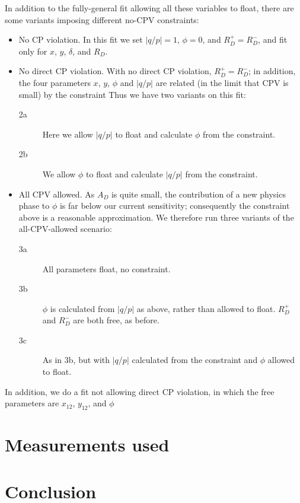 \documentclass[12pt,pdflatex]{article}
\begin{document}
In addition to the fully-general fit allowing all these variables to float, 
there are some variants imposing different no-CPV constraints:
\begin{itemize}
\item No CP violation. In this fit we set $|q/p|=1$, $\phi=0$, and $R_D^+=R_D^-$, 
and fit only for $x$, $y$, $\delta$, and $R_D$. 
\item No direct CP violation. With no direct CP violation, $R_D^+=R_D^-$;
in addition, the four parameters $x$, $y$, $\phi$ and $|q/p|$ are related 
(in the limit that CPV is small) by the constraint
Thus we have two variants on this fit:
\begin{description}
\item[2a] Here we allow $|q/p|$ to float and calculate $\phi$
from the constraint. 
\item[2b] We allow $\phi$ to float and calculate $|q/p|$ from the constraint. 
\end{description}
\item All CPV allowed. As $A_D$ is quite
small, the contribution of a new physics phase to $\phi$ is far below
our current sensitivity; consequently the constraint above is a reasonable
approximation. We therefore run three variants of the all-CPV-allowed 
scenario:
\begin{description}
\item[3a] All parameters float, no constraint.
\item[3b] $\phi$ is calculated from $|q/p|$ as above, rather than allowed to float.
$R_D^+$ and $R_D^-$ are both free, as before.
\item[3c] As in 3b, but with $|q/p|$ calculated from the constraint and $\phi$ allowed
to float.
\end{description}
\end{itemize}

In addition, we do a fit not allowing direct CP violation, in which the
free parameters are $x_{12}$, $y_{12}$, and $\phi$

\section{Measurements used}




\section{Conclusion}



\label{lastpage}
\end{document}
